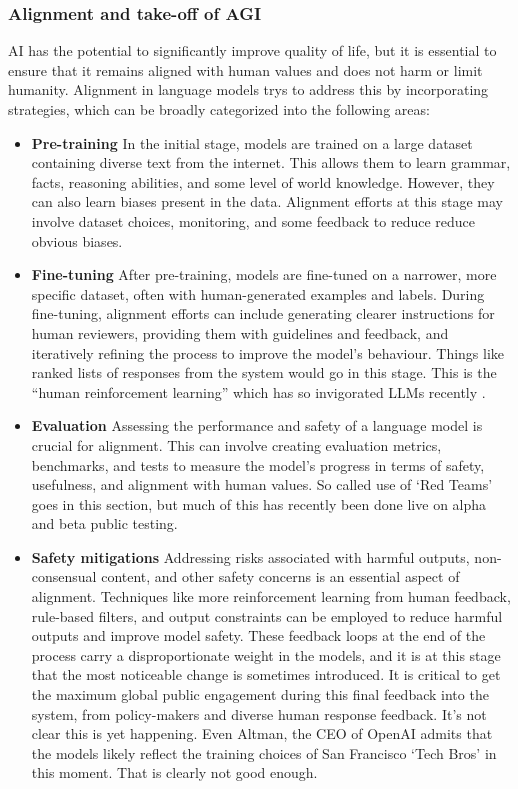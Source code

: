 \subsubsection{Alignment and take-off of AGI}
AI has the potential to significantly improve quality of life, but it is essential to ensure that it remains aligned with human values and does not harm or limit humanity. Alignment in language models trys to address this by incorporating strategies, which can be broadly categorized into the following areas:
\begin{itemize}
\item \textbf{Pre-training} In the initial stage, models are trained on a large dataset containing diverse text from the internet. This allows them to learn grammar, facts, reasoning abilities, and some level of world knowledge. However, they can also learn biases present in the data. Alignment efforts at this stage may involve dataset choices, monitoring, and some feedback to reduce reduce obvious biases.
\item \textbf{Fine-tuning} After pre-training, models are fine-tuned on a narrower, more specific dataset, often with human-generated examples and labels. During fine-tuning, alignment efforts can include generating clearer instructions for human reviewers, providing them with guidelines and feedback, and iteratively refining the process to improve the model's behaviour. Things like ranked lists of responses from the system would go in this stage. This is the ``human reinforcement learning'' which has so invigorated LLMs recently \cite{perez2022discovering}.
\item \textbf{Evaluation} Assessing the performance and safety of a language model is crucial for alignment. This can involve creating evaluation metrics, benchmarks, and tests to measure the model's progress in terms of safety, usefulness, and alignment with human values. So called use of `Red Teams' goes in this section, but much of this has recently been done live on alpha and beta public testing. 
\item \textbf{Safety mitigations} Addressing risks associated with harmful outputs, non-consensual content, and other safety concerns is an essential aspect of alignment. Techniques like more reinforcement learning from human feedback, rule-based filters, and output constraints can be employed to reduce harmful outputs and improve model safety. These feedback loops at the end of the process carry a disproportionate weight in the models, and it is at this stage that the most noticeable change is sometimes introduced. It is critical to get the maximum global public engagement during this final feedback into the system, from policy-makers and diverse human response feedback. It's not clear this is yet happening. Even Altman, the CEO of OpenAI admits that the models likely reflect the training choices of San Francisco `Tech Bros' in this moment. That is clearly not good enough.
\end{itemize}
